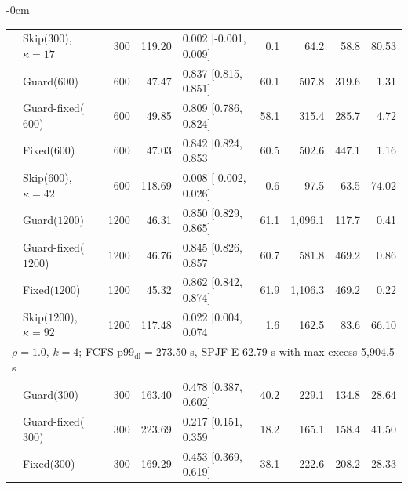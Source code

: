 \documentclass[mathematics,supfile,submit,moreauthors]{Definitions/mdpi}
\newcommand{\devnum}[1]{#1}
\begin{document}
\begin{table}[H]
\begin{adjustwidth}{-\extralength}{0cm}
\begin{tabular}{llrrlrrrr}
 & Skip($\devnum{300}$), $\kappa=17$ & \devnum{300} & \devnum{119.20} & \devnum{0.002 [-0.001, 0.009]} & \devnum{0.1} & \devnum{64.2} & \devnum{58.8} & \devnum{80.53} \\
 & Guard($\devnum{600}$)      & \devnum{600} & \devnum{47.47} & \devnum{0.837 [0.815, 0.851]} & \devnum{60.1} & \devnum{507.8} & \devnum{319.6} & \devnum{1.31} \\
 & Guard-fixed($\devnum{600}$) & \devnum{600} & \devnum{49.85} & \devnum{0.809 [0.786, 0.824]} & \devnum{58.1} & \devnum{315.4} & \devnum{285.7} & \devnum{4.72} \\
 & Fixed($\devnum{600}$)      & \devnum{600} & \devnum{47.03} & \devnum{0.842 [0.824, 0.853]} & \devnum{60.5} & \devnum{502.6} & \devnum{447.1} & \devnum{1.16} \\
 & Skip($\devnum{600}$), $\kappa=42$ & \devnum{600} & \devnum{118.69} & \devnum{0.008 [-0.002, 0.026]} & \devnum{0.6} & \devnum{97.5} & \devnum{63.5} & \devnum{74.02} \\
 & Guard($\devnum{1200}$)     & \devnum{1200} & \devnum{46.31} & \devnum{0.850 [0.829, 0.865]} & \devnum{61.1} & \devnum{1{,}096.1} & \devnum{117.7} & \devnum{0.41} \\
 & Guard-fixed($\devnum{1200}$) & \devnum{1200} & \devnum{46.76} & \devnum{0.845 [0.826, 0.857]} & \devnum{60.7} & \devnum{581.8} & \devnum{469.2} & \devnum{0.86} \\
 & Fixed($\devnum{1200}$)     & \devnum{1200} & \devnum{45.32} & \devnum{0.862 [0.842, 0.874]} & \devnum{61.9} & \devnum{1{,}106.3} & \devnum{469.2} & \devnum{0.22} \\
 & Skip($\devnum{1200}$), $\kappa=92$ & \devnum{1200} & \devnum{117.48} & \devnum{0.022 [0.004, 0.074]} & \devnum{1.6} & \devnum{162.5} & \devnum{83.6} & \devnum{66.10} \\
\midrule
\multicolumn{9}{l}{$\rho = \devnum{1.0}$, $k = \devnum{4}$; FCFS p99$_{\mathrm{dl}} = \devnum{273.50}$ s, SPJF-E \devnum{62.79} s with max excess \devnum{5{,}904.5} s} \\
 & Guard($\devnum{300}$)      & \devnum{300} & \devnum{163.40} & \devnum{0.478 [0.387, 0.602]} & \devnum{40.2} & \devnum{229.1} & \devnum{134.8} & \devnum{28.64} \\
 & Guard-fixed($\devnum{300}$) & \devnum{300} & \devnum{223.69} & \devnum{0.217 [0.151, 0.359]} & \devnum{18.2} & \devnum{165.1} & \devnum{158.4} & \devnum{41.50} \\
 & Fixed($\devnum{300}$)      & \devnum{300} & \devnum{169.29} & \devnum{0.453 [0.369, 0.619]} & \devnum{38.1} & \devnum{222.6} & \devnum{208.2} & \devnum{28.33} \\

\end{tabular}
\end{adjustwidth}
\end{table}
\end{document}
